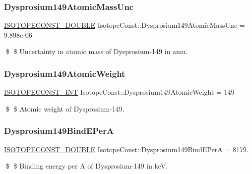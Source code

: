 \subsubsection{\texorpdfstring{Dysprosium149\+Atomic\+Mass\+Unc}{Dysprosium149AtomicMassUnc}}
{\footnotesize\ttfamily \mbox{\hyperlink{group___isotope_const-_macros_ga8f45a7272ce02c0b4c65c44636ed719a}{I\+S\+O\+T\+O\+P\+E\+C\+O\+N\+S\+T\+\_\+\+D\+O\+U\+B\+LE}} Isotope\+Const\+::\+Dysprosium149\+Atomic\+Mass\+Unc = 9.\+898e-\/06}

\$ \$ Uncertainty in atomic mass of Dysprosium-\/149 in amu. \mbox{\label{group___isotope_const-_dysprosium-_dy149_gaf522e7dfb2b2afcc7cdebfde2c945920}} 
\subsubsection{\texorpdfstring{Dysprosium149\+Atomic\+Weight}{Dysprosium149AtomicWeight}}
{\footnotesize\ttfamily \mbox{\hyperlink{group___isotope_const-_macros_ga5f18360b3e99483a35c32d789e62621c}{I\+S\+O\+T\+O\+P\+E\+C\+O\+N\+S\+T\+\_\+\+I\+NT}} Isotope\+Const\+::\+Dysprosium149\+Atomic\+Weight = 149}

\$ \$ Atomic weight of Dysprosium-\/149. \mbox{\label{group___isotope_const-_dysprosium-_dy149_gaa404923dd9c253fe9019c74e508f9d2f}} 
\subsubsection{\texorpdfstring{Dysprosium149\+Bind\+E\+PerA}{Dysprosium149BindEPerA}}
{\footnotesize\ttfamily \mbox{\hyperlink{group___isotope_const-_macros_ga8f45a7272ce02c0b4c65c44636ed719a}{I\+S\+O\+T\+O\+P\+E\+C\+O\+N\+S\+T\+\_\+\+D\+O\+U\+B\+LE}} Isotope\+Const\+::\+Dysprosium149\+Bind\+E\+PerA = 8179.}

\$ \$ Binding energy per A of Dysprosium-\/149 in keV. \mbox{\label{group___isotope_const-_dysprosium-_dy149_ga9cbdfbd6366dbf1a40681cb786acfc85}} 
